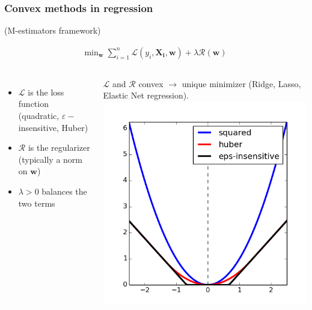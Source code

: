 \begin{frame}
\frametitle{Convex methods in regression}

(M-estimators framework)

\begin{align*}
\text{min}_{\mathbf{w}} \; \sum_{i=1}^n \mathcal{L}(y_i,\mathbf{X_i},\mathbf{w}) + \lambda \mathcal{R} (\mathbf{w})
\end{align*}


\begin{columns}
\begin{itemize}
\item $\mathcal{L}$ is the loss function (quadratic, $\varepsilon-$insensitive, Huber)
\item $\mathcal{R}$ is the regularizer (typically a norm on $\mathbf{w}$)
\item $\lambda > 0$ balances the two terms
\end{itemize}
$\mathcal{L}$ and $\mathcal{R}$ convex $\rightarrow$ unique minimizer (Ridge, Lasso, Elastic Net regression).
\includegraphics[width=\textwidth]{sklearn_material/losses.png}

\end{columns}
\end{frame}


